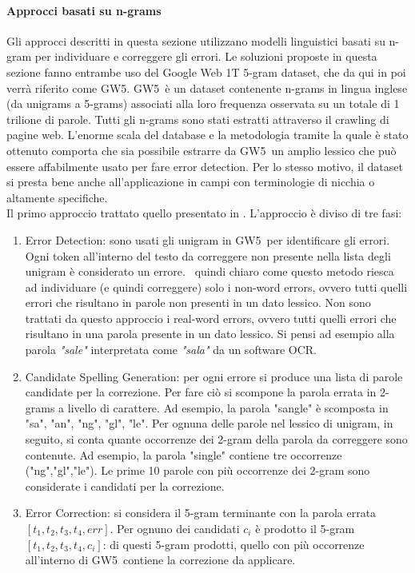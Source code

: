\paragraph{Approcci basati su n-grams}
\newcommand{\gw}{GW5}
Gli approcci descritti in questa sezione utilizzano modelli linguistici basati su n-gram per individuare e correggere gli errori. Le soluzioni proposte in questa sezione fanno entrambe uso del Google Web 1T 5-gram dataset\cite{google1t}, che da qui in poi verrà riferito come 	\gw. \gw\ è un dataset contenente n-grams in lingua inglese (da unigrams a 5-grams) associati alla loro frequenza osservata su un totale di 1 trilione di parole. Tutti gli n-grams sono stati estratti attraverso il crawling di pagine web. L'enorme scala del database e la metodologia tramite la quale è stato ottenuto comporta che sia possibile estrarre da \gw\ un amplio lessico che può essere affabilmente usato per fare error detection. Per lo stesso motivo, il dataset si presta bene anche all'applicazione in campi con terminologie di nicchia o altamente specifiche.\\
Il primo approccio trattato quello presentato in \cite{ocrG1}. L'approccio è diviso di tre fasi:
\begin{enumerate}
\item Error Detection: sono usati gli unigram in \gw\ per identificare gli errori. Ogni token all'interno del testo da correggere non presente nella lista degli unigram è considerato un errore. \E\ quindi chiaro come questo metodo riesca ad individuare (e quindi correggere) solo i non-word errors, ovvero tutti quelli errori che risultano in parole non presenti in un dato lessico. Non sono trattati da questo approccio i real-word errors, ovvero tutti quelli errori che risultano in una parola presente in un dato lessico. Si pensi ad esempio alla parola \textit{"sale"} interpretata come \textit{"sala"} da un software OCR.

\item Candidate Spelling Generation: per ogni errore si produce una lista di parole candidate per la correzione. Per fare ciò si scompone la parola errata in 2-grams a livello di carattere. Ad esempio, la parola "sangle" è scomposta in "sa", "an", "ng", "gl", "le". Per ognuna delle parole nel lessico di unigram, in seguito, si conta quante occorrenze dei 2-gram della parola da correggere sono contenute. Ad esempio, la parola "single" contiene tre occorrenze ("ng","gl","le"). Le prime 10 parole con più occorrenze dei 2-gram sono considerate i candidati per la correzione.

\item Error Correction: si considera il 5-gram terminante con la parola errata $[t_1,t_2,t_3,t_4,\textit{err}]$. Per ognuno dei candidati $c_i$ è prodotto il 5-gram $[t_1,t_2,t_3,t_4,{c_i}]$: di questi 5-gram prodotti, quello con più occorrenze all'interno di \gw\ contiene la correzione da applicare.
\end{enumerate}

